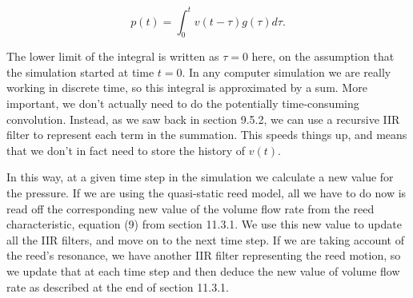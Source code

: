   \begin{equation*}p(t) = \int_0^t{v(t-\tau) g(\tau) d \tau} . 
  \tag{3}\end{equation*} 

  The lower limit of the integral is written as $\tau=0$ here, on the 
  assumption that the simulation started at time $t=0$. In any computer 
  simulation we are really working in discrete time, so this integral is 
  approximated by a sum. More important, we don’t actually need to do the 
  potentially time-consuming convolution. Instead, as we saw back in section 
  9.5.2, we can use a recursive IIR filter to represent each term in the 
  summation. This speeds things up, and means that we don’t in fact need to 
  store the history of $v(t)$. 

  In this way, at a given time step in the simulation we calculate a new value 
  for the pressure. If we are using the quasi-static reed model, all we have to 
  do now is read off the corresponding new value of the volume flow rate from 
  the reed characteristic, equation (9) from section 11.3.1. We use this new 
  value to update all the IIR filters, and move on to the next time step. If we 
  are taking account of the reed’s resonance, we have another IIR filter 
  representing the reed motion, so we update that at each time step and then 
  deduce the new value of volume flow rate as described at the end of section 
  11.3.1. 